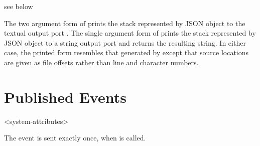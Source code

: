 \begin{procedure}
\end{procedure}
\returns{} see below

The two argument form of  prints the
stack represented by JSON object  to the textual output port .
The single argument form of  prints the stack
represented by JSON object  to a string output port and returns
the resulting string.
In either case, the printed form resembles that generated by 
except that source locations are given as file offsets rather than line and character
numbers.

\section {Published Events}

\begin{pubevent}{<system-attributes>}
\end{pubevent}

The  event is sent exactly once, when
 is called.
